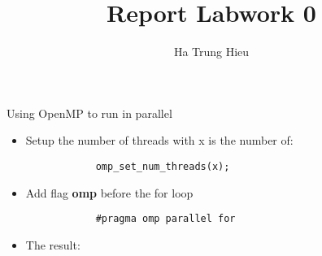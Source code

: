 \documentclass{article}
\title{Report Labwork 0}
\author{Ha Trung Hieu}
\begin{document}
\maketitle

Using OpenMP to run in parallel

\begin{itemize}
	\item Setup the number of threads with x is the number of:
		\begin{verbatim}
			omp_set_num_threads(x);
		\end{verbatim}
	\item Add flag \textbf{omp} before the for loop
		\begin{verbatim}
			#pragma omp parallel for
		\end{verbatim}
	\item The result:
\end{itemize}
\end{document}

